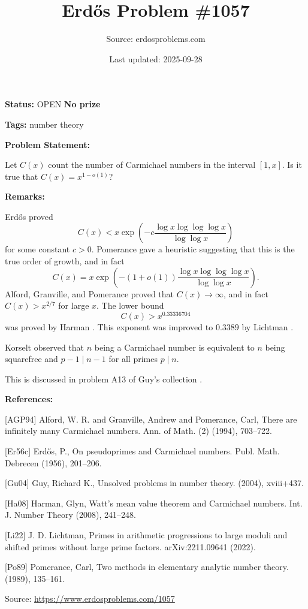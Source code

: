 \documentclass{article}
\title{Erd\H{o}s Problem \#1057}
\date{Last updated: 2025-09-28}
\author{Source: erdosproblems.com}
\begin{document}
\maketitle

\noindent\textbf{Status:} OPEN \quad \textbf{No prize}

\noindent\textbf{Tags:} number theory

\medskip
\noindent\textbf{Problem Statement:}

Let $C(x)$ count the number of Carmichael numbers in the interval $[1,x]$. Is it true that $C(x)=x^{1-o(1)}$?

\bigskip
\noindent\textbf{Remarks:}

Erd\H{o}s \cite{Er56c} proved\[C(x) < x \exp\left(-c \frac{\log x\log\log\log x}{\log\log x}\right)\]for some constant $c>0$. Pomerance \cite{Po89} gave a heuristic suggesting that this is the true order of growth, and in fact\[C(x)= x \exp\left(-(1+o(1))\frac{\log x\log\log\log x}{\log\log x}\right).\]Alford, Granville, and Pomerance \cite{AGP94} proved that $C(x)\to \infty$, and in fact $C(x)>x^{2/7}$ for large $x$. The lower bound\[C(x)> x^{0.33336704}\]was proved by Harman \cite{Ha08}. This exponent was improved to $0.3389$ by Lichtman \cite{Li22}.

Korselt observed that $n$ being a Carmichael number is equivalent to $n$ being squarefree and $p-1\mid n-1$ for all primes $p\mid n$.

This is discussed in problem A13 of Guy's collection \cite{Gu04}.

\bigskip
\noindent\textbf{References:}

[AGP94] Alford, W. R. and Granville, Andrew and Pomerance, Carl, There are infinitely many {C}armichael numbers. Ann. of Math. (2) (1994), 703--722.
 
 [Er56c] Erd\H{o}s, P., On pseudoprimes and {C}armichael numbers. Publ. Math. Debrecen (1956), 201--206.
 
 [Gu04] Guy, Richard K., Unsolved problems in number theory. (2004), xviii+437.
 
 [Ha08] Harman, Glyn, Watt's mean value theorem and {C}armichael numbers. Int. J. Number Theory (2008), 241--248.
 
 [Li22] J. D. Lichtman, Primes in arithmetic progressions to large moduli and shifted primes without large prime factors. arXiv:2211.09641 (2022).
 
 [Po89] Pomerance, Carl, Two methods in elementary analytic number theory. (1989), 135--161.

\bigskip
\noindent\small{Source: \url{https://www.erdosproblems.com/1057}}
\end{document}
